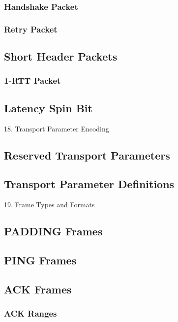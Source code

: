 \documentclass{article}
\begin{document}
\subsubsection{Handshake Packet}

\subsubsection{Retry Packet}

\subsection{Short Header Packets}

\subsubsection{1-RTT Packet}

\subsection{Latency Spin Bit}

18. Transport Parameter Encoding

\subsection{Reserved Transport Parameters}

\subsection{Transport Parameter Definitions}

19. Frame Types and Formats

\subsection{PADDING Frames}

\subsection{PING Frames}

\subsection{ACK Frames}

\subsubsection{ACK Ranges}
\end{document}
